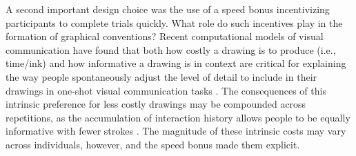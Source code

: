 A second important design choice was the use of a speed bonus incentivizing participants to complete trials quickly.
What role do such incentives play in the formation of graphical conventions?
Recent computational models of visual communication have found that both how costly a drawing is to produce (i.e., time/ink) and how informative a drawing is in context are critical for explaining the way people spontaneously adjust the level of detail to include in their drawings in one-shot visual communication tasks \cite{fan2019pragmatic}.
The consequences of this intrinsic preference for less costly drawings may be compounded across repetitions, as the accumulation of interaction history allows people to be equally informative with fewer strokes \cite{HawkinsFrankGoodman17_ConventionFormation}.
The magnitude of these intrinsic costs may vary across individuals, however, and the speed bonus made them explicit.



